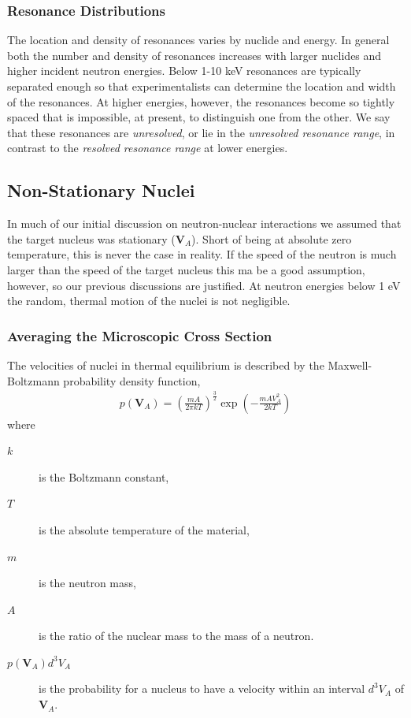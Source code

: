 \documentclass[11pt]{article}
\renewcommand\vec{\mathbf}
\begin{document}
\subsubsection{Resonance Distributions}
\label{sec:orgheadline17}
The location and density of resonances varies by nuclide and energy.  In general both the number and density of resonances increases with larger nuclides and higher incident neutron energies.  Below 1-10 keV resonances are typically separated enough so that experimentalists can determine the location and width of the resonances. At higher energies, however, the resonances become so tightly spaced that is impossible, at present, to distinguish one from the other.  We say that these resonances are \emph{unresolved}, or lie in the \emph{unresolved resonance range}, in contrast to the \emph{resolved resonance range} at lower energies.
\subsection{Non-Stationary Nuclei}
\label{sec:orgheadline22}
In much of our initial discussion on neutron-nuclear interactions we assumed that the target nucleus was stationary (\(\vec{V}_A\)).  Short of being at absolute zero temperature, this is never the case in reality.  If the speed of the neutron is much larger than the speed of the target nucleus this ma be a good assumption, however, so our previous discussions are justified.  At neutron energies below 1 eV the random, thermal motion of the nuclei is not negligible.

\subsubsection{Averaging the Microscopic Cross Section}
\label{sec:orgheadline19}
The velocities of nuclei in thermal equilibrium is described by the Maxwell-Boltzmann probability density function,
\begin{align}
  p(\vec{V}_A) = \left( \frac{mA}{2\pi k T} \right)^\frac{3}{2} \exp\left(-\frac{mAV_A^2}{2kT}\right) 
\end{align}
where
\begin{description}
\item[{\(k\)}] is the Boltzmann constant,
\item[{\(T\)}] is the absolute temperature of the material,
\item[{\(m\)}] is the neutron mass,
\item[{\(A\)}] is the ratio of the nuclear mass to the mass of a neutron.
\item[{\(p(\vec{V}_A)d^3V_A\)}] is the probability for a nucleus to have a velocity within an interval \(d^3V_A\) of \(\vec{V}_A\).
\end{description}
\end{document}
